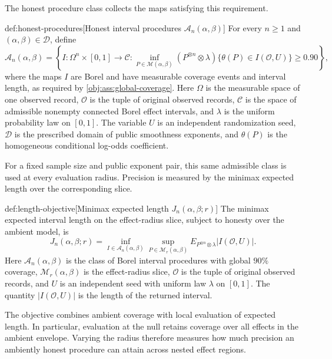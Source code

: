 The honest procedure class  collects the maps satisfying this requirement.

\begin{definitionv}{def:honest-procedures}[Honest interval procedures $\mathcal A_n(\alpha,\beta)$]
For every \(n\ge1\) and \((\alpha,\beta)\in\mathcal D\), define
\[
\mathcal A_n(\alpha,\beta)
=
\left\{
I:\Omega^n\times[0,1]\to\mathcal C:
\inf_{P\in\mathcal M(\alpha,\beta)}
(P^{\otimes n}\otimes\lambda)
\{\theta(P)\in I(\mathcal O,U)\}
\ge0.90
\right\},
\]
where the maps \(I\) are Borel and have measurable coverage events and interval length, as required by \cref{obj:ass:global-coverage}. Here \(\Omega\) is the measurable space of one observed record, \(\mathcal O\) is the tuple of original observed records, \(\mathcal C\) is the space of admissible nonempty connected Borel effect intervals, and \(\lambda\) is the uniform probability law on \([0,1]\). The variable \(U\) is an independent randomization seed, \(\mathcal D\) is the prescribed domain of public smoothness exponents, and \(\theta(P)\) is the homogeneous conditional log-odds coefficient.
\end{definitionv}

For a fixed sample size and public exponent pair, this same admissible class is used at every evaluation radius. Precision is measured by the minimax expected length  over the corresponding slice.

\begin{definitionv}{def:length-objective}[Minimax expected length $J_n(\alpha,\beta;r)$]
The minimax expected interval length on the effect-radius slice, subject to honesty over the ambient model, is
\[
J_n(\alpha,\beta;r)
=
\inf_{I\in\mathcal A_n(\alpha,\beta)}
\sup_{P\in\mathcal M_r(\alpha,\beta)}
E_{P^{\otimes n}\otimes\lambda}
\bigl|I(\mathcal O,U)\bigr|.
\]
Here \(\mathcal A_n(\alpha,\beta)\) is the class of Borel interval procedures with global \(90\%\) coverage, \(\mathcal M_r(\alpha,\beta)\) is the effect-radius slice, \(\mathcal O\) is the tuple of original observed records, and \(U\) is an independent seed with uniform law \(\lambda\) on \([0,1]\). The quantity \(\lvert I(\mathcal O,U)\rvert\) is the length of the returned interval.
\end{definitionv}

The objective combines ambient coverage with local evaluation of expected length. In particular, evaluation at the null retains coverage over all effects in the ambient envelope. Varying the radius therefore measures how much precision an ambiently honest procedure can attain across nested effect regions.
